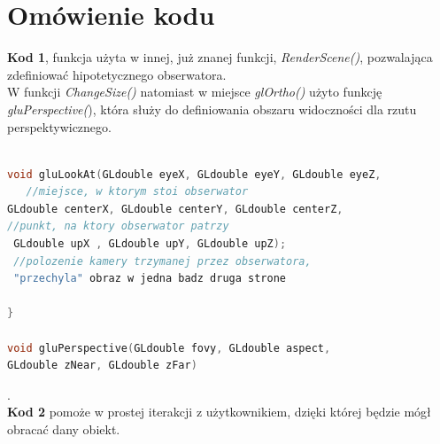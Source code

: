 \documentclass[a4paper,11pt]{article}
\begin{document}
  \section{Omówienie kodu}
   \textbf{Kod 1}, funkcja użyta w innej, już znanej funkcji, \textit{RenderScene()}, pozwalająca zdefiniować hipotetycznego obserwatora. 
\\\indent W funkcji \textit{ChangeSize()}  natomiast w miejsce \textit{glOrtho()} użyto funkcję \textit{gluPerspective(}), która służy do definiowania obszaru widoczności dla rzutu perspektywicznego.
{\small
\begin{lstlisting}[language=C++]

void gluLookAt(GLdouble eyeX, GLdouble eyeY, GLdouble eyeZ,                                 
   //miejsce, w ktorym stoi obserwator
GLdouble centerX, GLdouble centerY, GLdouble centerZ,            
//punkt, na ktory obserwator patrzy
 GLdouble upX , GLdouble upY, GLdouble upZ);		        
 //polozenie kamery trzymanej przez obserwatora,
 "przechyla" obraz w jedna badz druga strone

}

void gluPerspective(GLdouble fovy, GLdouble aspect, 
GLdouble zNear, GLdouble zFar)
\end{lstlisting}
}
.\\
\textbf{Kod 2} pomoże w prostej iterakcji z użytkownikiem, dzięki której będzie mógł obracać dany obiekt.
\end{document}
